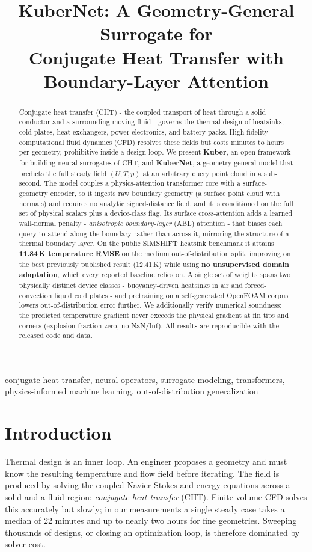 \documentclass[conference]{IEEEtran}
\title{KuberNet: A Geometry-General Surrogate for\\ Conjugate Heat Transfer with Boundary-Layer Attention}
\author{\IEEEauthorblockN{Shubh Jain\textsuperscript{*}\quad Hardik Agarwal\textsuperscript{*}}
\IEEEauthorblockA{\texttt{github.com/Kuber-research/Kuber_Thermal}\\
\textsuperscript{*}\,Equal contribution}}
\begin{document}
\maketitle

\begin{abstract}
Conjugate heat transfer (CHT) - the coupled transport of heat through a solid conductor and a
surrounding moving fluid - governs the thermal design of heatsinks, cold plates, heat exchangers,
power electronics, and battery packs. High-fidelity computational fluid dynamics (CFD) resolves these fields but costs minutes to
hours per geometry, prohibitive inside a design loop. We present \textbf{Kuber}, an open framework for
building neural surrogates of CHT, and \textbf{KuberNet}, a geometry-general model that
predicts the full steady field $(U,T,p)$ at an arbitrary query point cloud in a sub-second. The model
couples a physics-attention transformer core with a surface-geometry encoder, so it ingests raw
boundary geometry (a surface point cloud with normals) and requires no analytic signed-distance
field, and it is conditioned on the full set of physical scalars plus a device-class flag. Its surface
cross-attention adds a learned wall-normal penalty - \emph{anisotropic boundary-layer} (ABL) attention - that biases each query to
attend along the boundary rather than across it, mirroring the structure of a thermal boundary layer. On the
public SIMSHIFT heatsink benchmark it attains \textbf{11.84\,K temperature RMSE} on the medium
out-of-distribution split, improving on the best previously published result (12.41\,K) while using
\textbf{no unsupervised domain adaptation}, which every reported baseline relies on. A single set of
weights spans two physically distinct device classes - buoyancy-driven heatsinks in air and
forced-convection liquid cold plates - and pretraining on a self-generated OpenFOAM corpus lowers
out-of-distribution error further. We additionally verify numerical soundness: the predicted
temperature gradient never exceeds the physical gradient at fin tips and corners (explosion fraction
zero, no NaN/Inf). All results are reproducible with the released code and data.
\end{abstract}

\begin{IEEEkeywords}
conjugate heat transfer, neural operators, surrogate modeling, transformers, physics-informed machine
learning, out-of-distribution generalization
\end{IEEEkeywords}

\section{Introduction}
Thermal design is an inner loop. An engineer proposes a geometry and must know the resulting
temperature and flow field before iterating. The field is produced by solving the coupled
Navier-Stokes and energy equations across a solid and a fluid region: \emph{conjugate heat transfer}
(CHT). Finite-volume CFD solves this accurately but slowly; in our measurements a single steady case
takes a median of 22 minutes and up to nearly two hours for fine geometries. Sweeping thousands of
designs, or closing an optimization loop, is therefore dominated by solver cost.
\end{document}
